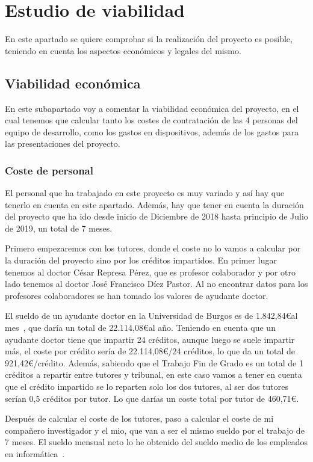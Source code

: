 \section{Estudio de viabilidad}
En este apartado se quiere comprobar si la realización del proyecto es posible, teniendo en cuenta los aspectos económicos y legales del mismo.
\subsection{Viabilidad económica}
En este subapartado voy a comentar la viabilidad económica del proyecto, en el cual tenemos que calcular tanto los costes de contratación de las 4 personas del equipo de desarrollo, como los gastos en dispositivos, además de los gastos para las presentaciones del proyecto.

\subsubsection{Coste de personal}
El personal que ha trabajado en este proyecto es muy variado y así hay que tenerlo en cuenta en este apartado. Además, hay que tener en cuenta la duración del proyecto que ha ido desde inicio de Diciembre de 2018 hasta principio de Julio de 2019, un total de 7 meses.

Primero empezaremos con los tutores, donde el coste no lo vamos a calcular por la duración del proyecto sino por los créditos impartidos. En primer lugar tenemos al doctor César Represa Pérez, que es profesor colaborador y por otro lado tenemos al doctor José Francisco Díez Pastor. Al no encontrar datos para los profesores colaboradores se han tomado los valores de ayudante doctor.

El sueldo de un ayudante doctor en la Universidad de Burgos es de 1.842,84\euro al mes~\cite{sueldos}, que daría un total de 22.114,08\euro al año. Teniendo en cuenta que un ayudante doctor tiene que impartir 24 créditos, aunque luego se suele impartir más, el coste por crédito sería de 22.114,08\euro/24 créditos, lo que da un total de 921,42\euro/crédito. Además, sabiendo que el Trabajo Fin de Grado es un total de 1 créditos a repartir entre tutores y tribunal, en este caso vamos a tener en cuenta que el crédito impartido se lo reparten solo los dos tutores, al ser dos tutores serían 0,5 créditos por tutor. Lo que darías un coste total por tutor de 460,71\euro.

Después de calcular el coste de los tutores, paso a calcular el coste de mi compañero investigador y el mio, que van a ser el mismo sueldo por el trabajo de 7 meses. El sueldo mensual neto lo he obtenido del sueldo medio de los empleados en informática~\cite{salario}.

